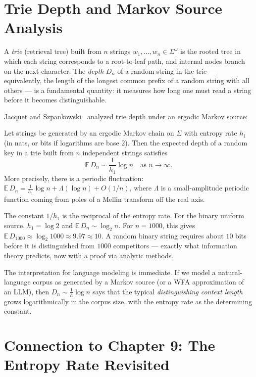 \section{Trie Depth and Markov Source Analysis}
\label{ch17:trie}

A \emph{trie} (retrieval tree) built from $n$ strings $w_1, \ldots, w_n \in \Sigma^\omega$ is the rooted tree in which each string corresponds to a root-to-leaf path, and internal nodes branch on the next character. The \emph{depth} $D_n$ of a random string in the trie --- equivalently, the length of the longest common prefix of a random string with all others --- is a fundamental quantity: it measures how long one must read a string before it becomes distinguishable.

Jacquet and Szpankowski~\cite{JacquetSzpankowski1991} analyzed trie depth under an ergodic Markov source:

\begin{proposition}
\label{ch17:trie-depth}
Let strings be generated by an ergodic Markov chain on $\Sigma$ with entropy rate $h_1$ (in nats, or bits if logarithms are base $2$). Then the expected depth of a random key in a trie built from $n$ independent strings satisfies
\[
  \mathbb{E}\, D_n \sim \frac{1}{h_1} \log n \quad \text{as } n \to \infty.
\]
More precisely, there is a periodic fluctuation: $\mathbb{E}\, D_n = \frac{1}{h_1} \log n + \Lambda(\log n) + O(1/n)$, where $\Lambda$ is a small-amplitude periodic function coming from poles of a Mellin transform off the real axis.
\end{proposition}

The constant $1/h_1$ is the reciprocal of the entropy rate. For the binary uniform source, $h_1 = \log 2$ and $\mathbb{E}\, D_n \sim \log_2 n$. For $n = 1000$, this gives $\mathbb{E}\, D_{1000} \approx \log_2 1000 \approx 9.97 \approx 10$. A random binary string requires about $10$ bits before it is distinguished from $1000$ competitors --- exactly what information theory predicts, now with a proof via analytic methods.

The interpretation for language modeling is immediate. If we model a natural-language corpus as generated by a Markov source (or a WFA approximation of an LLM), then $D_n \sim \frac{1}{h}\log n$ says that the typical \emph{distinguishing context length} grows logarithmically in the corpus size, with the entropy rate as the determining constant.

\section{Connection to Chapter 9: The Entropy Rate Revisited}
\label{ch17:entropy-connection}

